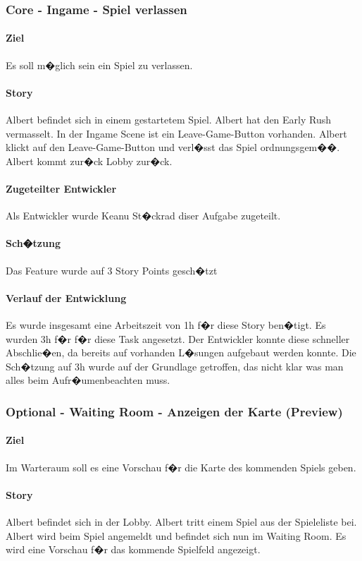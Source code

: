 \documentclass[12pt, titlepage]{scrartcl}
\begin{document}
			\subsubsection{Core - Ingame - Spiel verlassen}
			\paragraph{Ziel} Es soll m�glich sein ein Spiel zu verlassen.
			\paragraph{Story} Albert befindet sich in einem gestartetem Spiel. Albert hat den Early Rush vermasselt. In der Ingame Scene ist ein Leave-Game-Button vorhanden. Albert klickt auf den Leave-Game-Button und verl�sst das Spiel ordnungsgem��. Albert kommt zur�ck Lobby zur�ck.
			\paragraph{Zugeteilter Entwickler} Als Entwickler wurde Keanu St�ckrad diser Aufgabe zugeteilt.
			\paragraph{Sch�tzung}
			Das Feature wurde auf 3 Story Points gesch�tzt
			\paragraph{Verlauf der Entwicklung} 
			Es wurde insgesamt eine Arbeitszeit von 1h f�r diese Story ben�tigt. Es wurden 3h f�r f�r diese Task angesetzt. Der Entwickler konnte diese schneller Abschlie�en, da bereits auf vorhanden L�sungen aufgebaut werden konnte. Die Sch�tzung auf 3h wurde auf der Grundlage getroffen, das nicht klar was man alles beim \glqq Aufr�umen\grqq beachten muss.
			
			\subsubsection{Optional - Waiting Room - Anzeigen der Karte (Preview)}
			\paragraph{Ziel} Im Warteraum soll es eine Vorschau f�r die Karte des kommenden Spiels geben.
			\paragraph{Story} Albert befindet sich in der Lobby. Albert tritt einem Spiel aus der Spieleliste bei. Albert wird beim Spiel angemeldt und befindet sich nun im Waiting Room. Es wird eine Vorschau f�r das kommende Spielfeld angezeigt.
\end{document}
